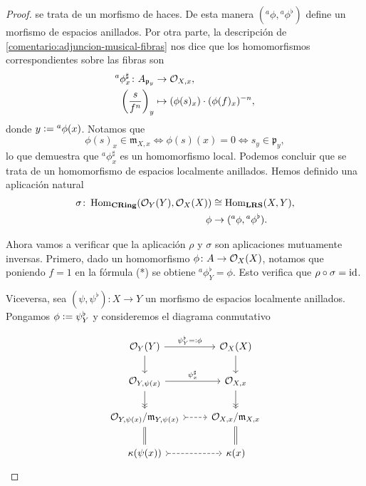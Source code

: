 \documentclass{article}
\numberwithin{equation}{section}
\theoremstyle{definition}
\begin{document}
\begin{teorema}
\begin{proof}
    se trata de un morfismo de haces. De esta manera
    $({}^a \phi, {}^a \phi^\flat)$ define un morfismo de espacios anillados.
    Por otra parte, la descripción de \ref{comentario:adjuncion-musical-fibras}
    nos dice que los homomorfismos correspondientes sobre las fibras son
    \begin{align*}
      {}^a \phi^\sharp_x\colon A_{\mathfrak{p}_y} & \to \mathcal{O}_{X,x},\\
      \left(\frac{s}{f^n}\right)_y & \mapsto (\phi (s)_x)\cdot (\phi (f)_x)^{-n},
    \end{align*}
    donde $y \mathrel{\mathop:}= {}^a \phi (x)$. Notamos que
    $$\phi (s)_x \in \mathfrak{m}_{X,x} \iff \phi (s) (x) = 0 \iff s_y \in \mathfrak{p}_y,$$
    lo que demuestra que ${}^a \phi^\sharp_x$ es un homomorfismo local. Podemos
    concluir que se trata de un homomorfismo de espacios localmente
    anillados. Hemos definido una aplicación natural
    \begin{align*}
      \sigma\colon \operatorname{Hom}_{\text{\bf CRing}} (\mathcal{O}_Y (Y), \mathcal{O}_X (X)) & \cong \operatorname{Hom}_{\text{\bf LRS}} (X, Y),\\
      \phi & \to ({}^a \phi, {}^a \phi^\flat).
    \end{align*}

    \vspace{1em}

    Ahora vamos a verificar que la aplicación $\rho$ y $\sigma$ son aplicaciones
    mutuamente inversas. Primero, dado un homomorfismo
    $\phi\colon A \to \mathcal{O}_X (X)$, notamos que poniendo $f = 1$ en la fórmula (*)
    se obtiene ${}^a \phi^\flat_Y = \phi$. Esto verifica que
    $\rho\circ\sigma = \mathrm{id}$.

    Viceversa, sea $(\psi,\psi^\flat)\colon X \to Y$ un morfismo de espacios
    localmente anillados. Pongamos $\phi \mathrel{\mathop:}= \psi^\flat_Y$ y consideremos
    el diagrama conmutativo

    \[ \begin{tikzcd}
        \O_Y (Y) \ar{d}\ar{r}{\psi^\flat_Y \rdfn \phi} & \O_X (X) \ar{d} \\
        \O_{Y, \psi (x)} \ar[->>]{d}\ar{r}{\psi^\sharp_x} & \O_{X,x}\ar[->>]{d} \\
        \O_{Y, \psi (x)}/\mathfrak{m}_{Y,\psi (x)} \ar[equals]{d}\ar[dashed,>->]{r} & \O_{X,x}/\mathfrak{m}_{X,x}\ar[equals]{d} \\
        \kappa (\psi (x))\ar[dashed,>->]{r} & \kappa (x)
      \end{tikzcd} \]


\end{proof}
\end{teorema}
\end{document}
